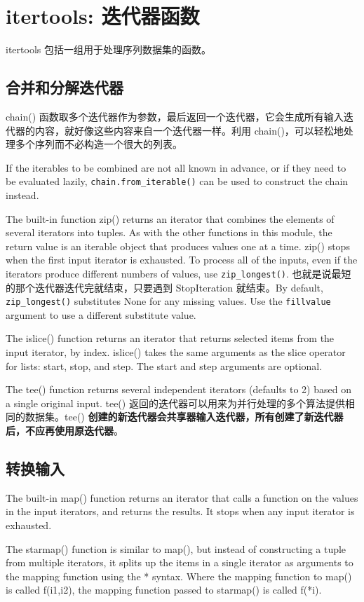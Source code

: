 \section{itertools: 迭代器函数}
itertools 包括一组用于处理序列数据集的函数。
\subsection{合并和分解迭代器}
chain() 函数取多个迭代器作为参数，最后返回一个迭代器，它会生成所有输入迭代器的内容，就好像这些内容来自一个迭代器一样。利用 chain()，可以轻松地处理多个序列而不必构造一个很大的列表。

If the iterables to be combined are not all known in advance, or if they need to be evaluated lazily, \verb|chain.from_iterable()| can be used to construct the chain instead.

The built-in function zip() returns an iterator that combines the elements of several iterators into tuples. As with the other functions in this module, the return value is an iterable object that produces values one at a time. zip() stops when the first input iterator is exhausted. To process all of the inputs, even if the iterators produce different numbers of values, use \verb|zip_longest()|. 也就是说最短的那个迭代器迭代完就结束，只要遇到 StopIteration 就结束。By default, \verb|zip_longest()| substitutes None for any missing values. Use the \verb|fillvalue| argument to use a different substitute value.

The islice() function returns an iterator that returns selected items from the input iterator, by index. islice() takes the same arguments as the slice operator for lists: start, stop, and step. The start and step arguments are optional.

The tee() function returns several independent iterators (defaults to 2) based on a single original input. tee() 返回的迭代器可以用来为并行处理的多个算法提供相同的数据集。tee() \textbf{创建的新迭代器会共享器输入迭代器，所有创建了新迭代器后，不应再使用原迭代器}。

\subsection{转换输入}
The built-in map() function returns an iterator that calls a function on the values in the input iterators, and returns the results. It stops when any input iterator is exhausted.

The starmap() function is similar to map(), but instead of constructing a tuple from multiple iterators, it splits up the items in a single iterator as arguments to the mapping function using the * syntax. Where the mapping function to map() is called f(i1,i2), the mapping function passed to starmap() is called f(*i).

